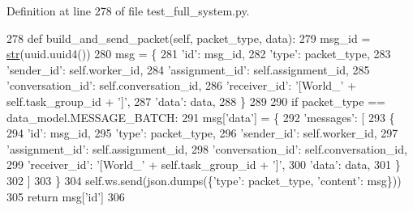 Definition at line 278 of file test\+\_\+full\+\_\+system.\+py.


\begin{DoxyCode}
278     \textcolor{keyword}{def }build\_and\_send\_packet(self, packet\_type, data):
279         msg\_id = \hyperlink{namespacegenerate__task__READMEs_a5b88452ffb87b78c8c85ececebafc09f}{str}(uuid.uuid4())
280         msg = \{
281             \textcolor{stringliteral}{'id'}: msg\_id,
282             \textcolor{stringliteral}{'type'}: packet\_type,
283             \textcolor{stringliteral}{'sender\_id'}: self.worker\_id,
284             \textcolor{stringliteral}{'assignment\_id'}: self.assignment\_id,
285             \textcolor{stringliteral}{'conversation\_id'}: self.conversation\_id,
286             \textcolor{stringliteral}{'receiver\_id'}: \textcolor{stringliteral}{'[World\_'} + self.task\_group\_id + \textcolor{stringliteral}{']'},
287             \textcolor{stringliteral}{'data'}: data,
288         \}
289 
290         \textcolor{keywordflow}{if} packet\_type == data\_model.MESSAGE\_BATCH:
291             msg[\textcolor{stringliteral}{'data'}] = \{
292                 \textcolor{stringliteral}{'messages'}: [
293                     \{
294                         \textcolor{stringliteral}{'id'}: msg\_id,
295                         \textcolor{stringliteral}{'type'}: packet\_type,
296                         \textcolor{stringliteral}{'sender\_id'}: self.worker\_id,
297                         \textcolor{stringliteral}{'assignment\_id'}: self.assignment\_id,
298                         \textcolor{stringliteral}{'conversation\_id'}: self.conversation\_id,
299                         \textcolor{stringliteral}{'receiver\_id'}: \textcolor{stringliteral}{'[World\_'} + self.task\_group\_id + \textcolor{stringliteral}{']'},
300                         \textcolor{stringliteral}{'data'}: data,
301                     \}
302                 ]
303             \}
304         self.ws.send(json.dumps(\{\textcolor{stringliteral}{'type'}: packet\_type, \textcolor{stringliteral}{'content'}: msg\}))
305         \textcolor{keywordflow}{return} msg[\textcolor{stringliteral}{'id'}]
306 
\end{DoxyCode}
\mbox{\label{classparlai_1_1mturk_1_1core_1_1dev_1_1test_1_1test__full__system_1_1MockAgent_a9fb654ef5b3775a6991dc1dcafa16835}} 
